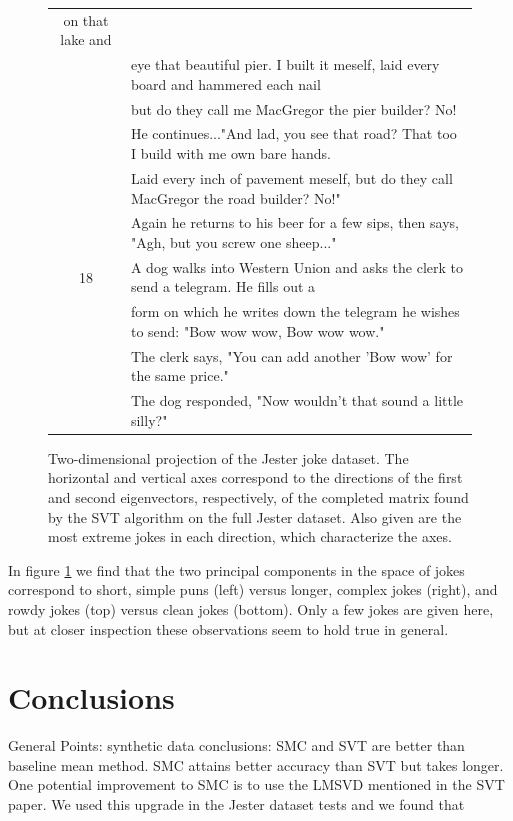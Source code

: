 \documentclass{article} %
\begin{document}
\begin{figure} [h]
\begin{tabular}{c | l}
       on that lake and \\
     & eye that beautiful pier. I built it meself, laid every board
       and hammered each nail \\
     & but do they call me MacGregor the pier builder? No! \\
     & He continues..."And lad, you see that road? That too I build with me
       own bare hands. \\
     & Laid every inch of pavement meself, but do they
       call MacGregor the road builder? No!" \\
     & Again he returns to his beer for a few sips, then says,
       "Agh, but you screw  one sheep..." \\ \hline
  18 & A dog walks into Western Union and asks the clerk to send a
       telegram. He fills out a \\
     & form on which he writes down the telegram he wishes to send:
       "Bow wow wow, Bow wow wow." \\
     & The clerk says, "You can add another 'Bow wow' for the same
       price."\\
     & The dog responded, "Now wouldn't that sound a little silly?"\\ 
\hline \hline
\end{tabular}

\caption{Two-dimensional projection of the Jester joke dataset. The
  horizontal and vertical axes correspond to the directions of the
  first and second eigenvectors, respectively, of the completed matrix
  found by the SVT algorithm on the full Jester dataset. Also given
  are the most extreme jokes in each direction, which characterize the
  axes.}
\label{jokes2d}
\end{figure}

In figure \ref{jokes2d} we find that the two principal components in
the space of jokes correspond to short, simple puns (left) versus
longer, complex jokes (right), and rowdy jokes (top) versus clean
jokes (bottom). Only a few jokes are given here, but at closer
inspection these observations seem to hold true in general.


\section{Conclusions}

General Points: synthetic data conclusions: SMC and SVT are better
than baseline mean method. SMC attains better accuracy than SVT but
takes longer. One potential improvement to SMC is to use the LMSVD
mentioned in the SVT paper. We used this upgrade in the Jester dataset
tests and we found that
\end{document}

